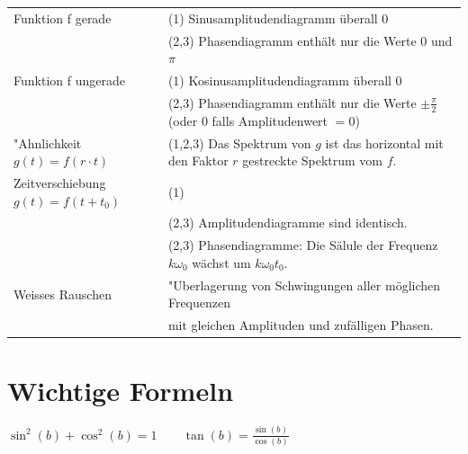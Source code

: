 \begin{tabular}{ll}
	Funktion f gerade 
	& (1) Sinusamplitudendiagramm überall 0 \\
	& (2,3) Phasendiagramm enthält nur die Werte $0$ und $\pi$ \\
	Funktion f ungerade
	& (1) Kosinusamplitudendiagramm überall 0 \\
	& (2,3) Phasendiagramm enthält nur die Werte $\pm \frac{\pi}{2}$ (oder $0$ falls Amplitudenwert $=0$) \\
	"Ahnlichkeit $g(t) = f(r \cdot t) $
	& (1,2,3) Das Spektrum von $g$ ist das horizontal mit den Faktor $r$ gestreckte Spektrum vom $f$. \\
	Zeitverschiebung $g(t) = f(t + t_0) $
	& (1) \verweis{Fourier_Zeitverschiebung}{Zeitverschiebung} \\
	& (2,3) Amplitudendiagramme sind identisch. \\
	& (2,3) Phasendiagramme: Die Sälule der Frequenz $k \omega_0$ wächst um $k\omega_0 t_0$. \\
	Weisses Rauschen
	& "Uberlagerung von Schwingungen aller möglichen Frequenzen \\
	& mit gleichen Amplituden und zufälligen Phasen. 

\end{tabular}


\newpage
\label{LastPage}
\section{Wichtige Formeln}
	$\sin^2(b)+\cos^2(b)=1 \qquad \tan(b)=\frac{\sin(b)}{\cos(b)}$
	
	
